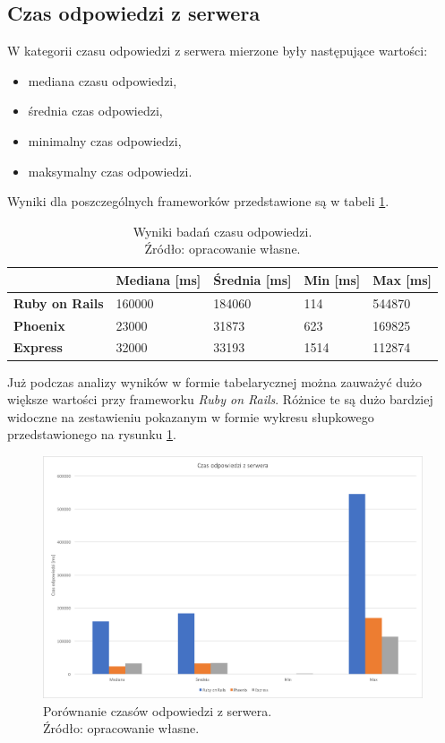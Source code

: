 \subsection{Czas odpowiedzi z serwera}
W kategorii czasu odpowiedzi z serwera mierzone były następujące wartości:
\begin{itemize}
  \item mediana czasu odpowiedzi,
  \item średnia czas odpowiedzi,
  \item minimalny czas odpowiedzi,
  \item maksymalny czas odpowiedzi.
\end{itemize}

Wyniki dla poszczególnych frameworków przedstawione są w tabeli \ref{tab:czas_odp}.

\begin{table}[h]
\centering
\caption{Wyniki badań czasu odpowiedzi.\\Źródło: opracowanie własne.}
\label{tab:czas_odp}
\begin{tabular}{|l|l|l|l|l|}
\hline
              & \textbf{Mediana {[}ms{]}} & \textbf{Średnia {[}ms{]}} & \textbf{Min {[}ms{]}} & \textbf{Max {[}ms{]}} \\ \hline
\textbf{Ruby on Rails} & 160000           & 184060           & 114          & 544870       \\ \hline
\textbf{Phoenix}       & 23000            & 31873            & 623          & 169825       \\ \hline
\textbf{Express}       & 32000            & 33193            & 1514         & 112874       \\ \hline
\end{tabular}
\end{table}

Już podczas analizy wyników w formie tabelarycznej można zauważyć dużo większe wartości przy frameworku \emph{Ruby on Rails}. Różnice te są dużo bardziej widoczne na zestawieniu pokazanym w formie wykresu słupkowego przedstawionego na rysunku \ref{fig:response_times}.
\newpage
\begin{figure}[h]
  \centering
  \includegraphics[width=\linewidth]{images/response_times}
  \caption{Porównanie czasów odpowiedzi z serwera.\\Źródło: opracowanie własne.}
  \label{fig:response_times}
\end{figure}

